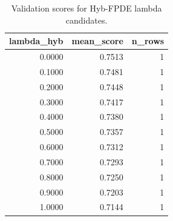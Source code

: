 \begin{table}[t]
\caption{Validation scores for Hyb-FPDE lambda candidates.}
\label{tab:lambda_distribution_computed}
\centering
\begin{tabular}{rrr}
\toprule
lambda\_hyb & mean\_score & n\_rows \\
\midrule
0.0000 & 0.7513 & 1 \\
0.1000 & 0.7481 & 1 \\
0.2000 & 0.7448 & 1 \\
0.3000 & 0.7417 & 1 \\
0.4000 & 0.7380 & 1 \\
0.5000 & 0.7357 & 1 \\
0.6000 & 0.7312 & 1 \\
0.7000 & 0.7293 & 1 \\
0.8000 & 0.7250 & 1 \\
0.9000 & 0.7203 & 1 \\
1.0000 & 0.7144 & 1 \\
\bottomrule
\end{tabular}

\end{table}

